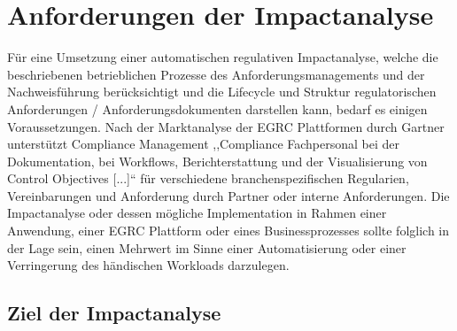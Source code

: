 \chapter{Anforderungen der Impactanalyse}

    Für eine Umsetzung einer automatischen regulativen Impactanalyse, welche die beschriebenen betrieblichen Prozesse des Anforderungsmanagements und der Nachweisführung berücksichtigt und die Lifecycle und Struktur regulatorischen Anforderungen / Anforderungsdokumenten darstellen kann, bedarf es einigen Voraussetzungen.  
    Nach der Marktanalyse der \ac{EGRC} Plattformen durch Gartner\cite{app_gartner} unterstützt Compliance Management ,,Compliance Fachpersonal bei der Dokumentation, bei Workflows, Berichterstattung und der Visualisierung von Control Objectives [...]``\cite[S.4 (übersetzt)]{app_gartner} für verschiedene branchenspezifischen Regularien, Vereinbarungen und Anforderung durch Partner oder interne Anforderungen.       
    Die Impactanalyse oder dessen mögliche Implementation in Rahmen einer Anwendung, einer \ac{EGRC} Plattform oder eines Businessprozesses sollte folglich in der Lage sein, einen Mehrwert im Sinne einer Automatisierung oder einer Verringerung des händischen Workloads darzulegen.


    

\section{Ziel der Impactanalyse}

